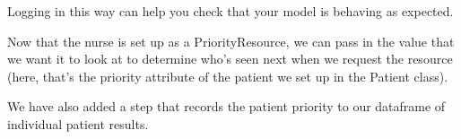 \documentclass[
  letterpaper,
  DIV=11,
  numbers=noendperiod]{scrreprt}
\begin{document}
\begin{tcolorbox}[enhanced jigsaw, colframe=quarto-callout-tip-color-frame, bottomtitle=1mm, breakable, rightrule=.15mm, coltitle=black, colbacktitle=quarto-callout-tip-color!10!white, opacityback=0, leftrule=.75mm, arc=.35mm, toptitle=1mm, title=\textcolor{quarto-callout-tip-color}{\faLightbulb}\hspace{0.5em}{Tip}, titlerule=0mm, colback=white, toprule=.15mm, bottomrule=.15mm, left=2mm, opacitybacktitle=0.6]

Logging in this way can help you check that your model is behaving as
expected.

\end{tcolorbox}

Now that the nurse is set up as a PriorityResource, we can pass in the
value that we want it to look at to determine who's seen next when we
request the resource (here, that's the priority attribute of the patient
we set up in the Patient class).

We have also added a step that records the patient priority to our
dataframe of individual patient results.
\end{document}
